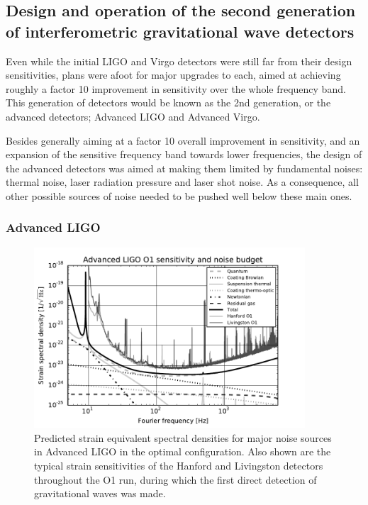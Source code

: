 \subsection{Design and operation of the second generation of interferometric gravitational wave detectors}\label{subsec:2ndgen}

Even while the initial LIGO and Virgo detectors were still far from their design sensitivities, plans were afoot for major 
upgrades to each, aimed at achieving roughly a factor 10 improvement in sensitivity over the whole frequency band. 
This generation of detectors would be known as the 2nd generation, or the advanced detectors; Advanced LIGO and 
Advanced Virgo. 

Besides generally aiming at a factor 10 overall improvement in sensitivity, and an expansion of the sensitive 
frequency band towards lower frequencies, the design of the advanced detectors was aimed at making them 
limited by fundamental noises: thermal noise, laser radiation pressure and laser shot noise. As a consequence, all other possible 
sources of noise needed to be pushed well below these main ones.

\subsubsection{Advanced LIGO}

\begin{figure}[htb]
\begin{center}
\includegraphics[width=0.9\textwidth]{aLIGOnbudget_gray.pdf}
\caption{Predicted strain equivalent spectral densities for major noise sources in Advanced LIGO in the 
optimal configuration. Also shown are the typical strain sensitivities of the Hanford and Livingston detectors 
throughout the O1 run, during which the first direct detection of gravitational waves was made.}
\end{center}
\label{aLIGOnbudget}\end{figure}

